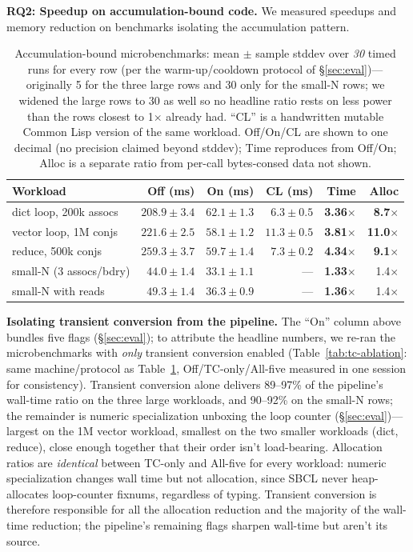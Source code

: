 \documentclass[sigplan,review,anonymous]{acmart}
\begin{document}
\textbf{RQ2: Speedup on accumulation-bound code.} We measured speedups and memory reduction on benchmarks isolating the accumulation pattern.

\begin{table}[h]
  \caption{Accumulation-bound microbenchmarks: mean $\pm$ sample stddev over
  \emph{30} timed runs for every row (per the warm-up/cooldown protocol of
  §\ref{sec:eval})---originally 5 for the three large rows and 30 only for
  the small-N rows; we widened the large rows to 30 as well so no headline
  ratio rests on less power than the rows closest to 1$\times$ already had.
  ``CL'' is a handwritten mutable Common Lisp version of the same workload.
  Off/On/CL are shown to one decimal (no precision claimed beyond
  stddev); Time reproduces from Off/On; Alloc is a separate ratio from
  per-call bytes-consed data not shown.}
  \label{tab:microbenchmarks}
  \footnotesize
  \setlength{\tabcolsep}{2.5pt}
  \begin{tabular}{@{}lrrrrr@{}}
    \toprule
    Workload & Off (ms) & On (ms) & CL (ms) & Time & Alloc \\
    \midrule
    dict loop, 200k assocs  & $208.9\pm3.4$ & $62.1\pm1.3$ & $6.3\pm0.5$ & \textbf{3.36$\times$} & \textbf{8.7$\times$} \\
    vector loop, 1M conjs   & $221.6\pm2.5$ & $58.1\pm1.2$ & $11.3\pm0.5$ & \textbf{3.81$\times$} & \textbf{11.0$\times$} \\
    reduce, 500k conjs      & $259.3\pm3.7$ & $59.7\pm1.4$ & $7.3\pm0.2$ & \textbf{4.34$\times$} & \textbf{9.1$\times$} \\
    small-N (3 assocs/bdry) & $44.0\pm1.4$  & $33.1\pm1.1$ & ---         & \textbf{1.33$\times$} & 1.4$\times$ \\
    small-N with reads      & $49.3\pm1.4$  & $36.3\pm0.9$ & ---         & \textbf{1.36$\times$} & 1.4$\times$ \\
  \bottomrule
\end{tabular}
\end{table}

\textbf{Isolating transient conversion from the pipeline.} The ``On'' column above bundles five flags (§\ref{sec:eval}); to attribute the headline numbers, we re-ran the microbenchmarks with \emph{only} transient conversion enabled (Table~\ref{tab:tc-ablation}: same machine/protocol as Table~\ref{tab:microbenchmarks}, Off/TC-only/All-five measured in one session for consistency). Transient conversion alone delivers 89--97\% of the pipeline's wall-time ratio on the three large workloads, and 90--92\% on the small-N rows; the remainder is numeric specialization unboxing the loop counter (§\ref{sec:eval})---largest on the 1M vector workload, smallest on the two smaller workloads (dict, reduce), close enough together that their order isn't load-bearing. Allocation ratios are \emph{identical} between TC-only and All-five for every workload: numeric specialization changes wall time but not allocation, since SBCL never heap-allocates loop-counter fixnums, regardless of typing. Transient conversion is therefore responsible for all the allocation reduction and the majority of the wall-time reduction; the pipeline's remaining flags sharpen wall-time but aren't its source.
\end{document}
